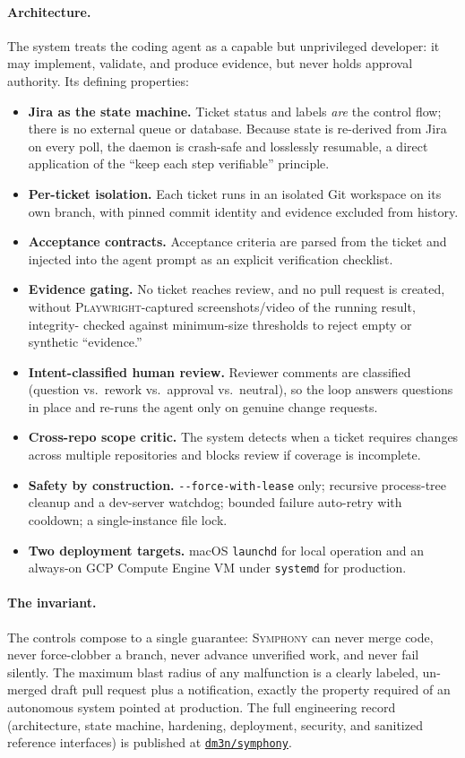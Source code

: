 \documentclass[11pt]{article}
\theoremstyle{plain}
\theoremstyle{definition}
\newcommand{\repo}[1]{\href{https://github.com/dm3n/#1}{\nolinkurl{dm3n/#1}}}
\begin{document}
\paragraph{Architecture.} The system treats the coding agent as a capable but unprivileged
developer: it may implement, validate, and produce evidence, but never holds approval
authority. Its defining properties:
\begin{itemize}
  \item \textbf{Jira as the state machine.} Ticket status and labels \emph{are} the control
  flow; there is no external queue or database. Because state is re-derived from Jira on
  every poll, the daemon is crash-safe and losslessly resumable, a direct application of
  the ``keep each step verifiable'' principle.
  \item \textbf{Per-ticket isolation.} Each ticket runs in an isolated Git workspace on its
  own branch, with pinned commit identity and evidence excluded from history.
  \item \textbf{Acceptance contracts.} Acceptance criteria are parsed from the ticket and
  injected into the agent prompt as an explicit verification checklist.
  \item \textbf{Evidence gating.} No ticket reaches review, and no pull request is created,
  without \textsc{Playwright}-captured screenshots/video of the running result, integrity-
  checked against minimum-size thresholds to reject empty or synthetic ``evidence.''
  \item \textbf{Intent-classified human review.} Reviewer comments are classified
  (question vs.\ rework vs.\ approval vs.\ neutral), so the loop answers questions in place
  and re-runs the agent only on genuine change requests.
  \item \textbf{Cross-repo scope critic.} The system detects when a ticket requires changes
  across multiple repositories and blocks review if coverage is incomplete.
  \item \textbf{Safety by construction.} \texttt{-{}-force-with-lease} only; recursive
  process-tree cleanup and a dev-server watchdog; bounded failure auto-retry with cooldown;
  a single-instance file lock.
  \item \textbf{Two deployment targets.} macOS \texttt{launchd} for local operation and an
  always-on GCP Compute Engine VM under \texttt{systemd} for production.
\end{itemize}

\paragraph{The invariant.} The controls compose to a single guarantee: \textsc{Symphony}
can never merge code, never force-clobber a branch, never advance unverified work, and never
fail silently. The maximum blast radius of any malfunction is a clearly labeled, un-merged
draft pull request plus a notification, exactly the property required of an autonomous
system pointed at production. The full engineering record (architecture, state machine,
hardening, deployment, security, and sanitized reference interfaces) is published at
\repo{symphony}.
\end{document}
